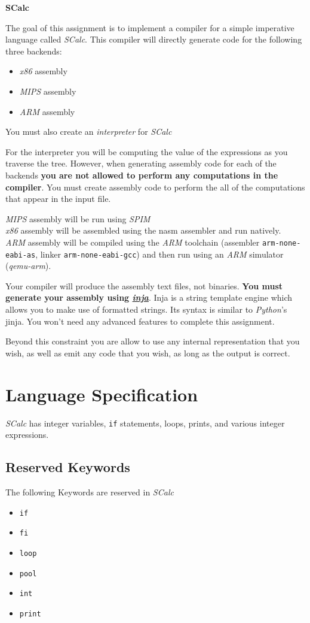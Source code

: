 \documentclass{article}
\newcommand{\code}[1]{\texttt{\textmd{#1}}}
\begin{document}
\ifpdf
  \LARGE
  \textbf{SCalc}
  \normalsize
\fi

The goal of this assignment is to implement a compiler for a simple imperative language called
\textit{SCalc}. This compiler will directly generate code for the following three backends:
\begin {itemize}
  \item \textit{x86} assembly
  \item \textit{MIPS} assembly
  \item \textit{ARM} assembly
\end {itemize}
You must also create an \textit{interpreter} for \textit{SCalc}

For the interpreter you will be computing the value of the expressions as you traverse the tree.
However, when generating assembly code for each of the backends \textbf{you are not allowed to
perform any computations in the compiler}. You must create assembly code to perform the all of the
computations that appear in the input file.

\textit{MIPS} assembly will be run using \textit{SPIM}\\
\textit{x86} assembly will be assembled using the nasm assembler and run natively.\\
\textit{ARM} assembly will be compiled using the \textit{ARM} toolchain (assembler
\code{arm-none-eabi-as}, linker \code{arm-none-eabi-gcc}) and then run using an \textit{ARM}
simulator (\textit{qemu-arm}).

Your compiler will produce the assembly text files, not binaries. \textbf{You must generate your
assembly using \href{https://github.com/pantor/inja}{\textit{inja}}}. Inja is a string template
engine which allows you to make use of formatted strings. Its syntax is similar to
\textit{Python}'s jinja. You won't need any advanced features to complete this assignment.

Beyond this constraint you are allow to use any internal representation that you wish, as well as
emit any code that you wish, as long as the output is correct.

\section{Language Specification}
\textit{SCalc} has integer variables, \code{if} statements, loops, prints, and various integer expressions.
\subsection{Reserved Keywords}
The following Keywords are reserved in \textit{SCalc}
\begin {itemize}
  \item{\code{if}}
  \item{\code{fi}}
  \item{\code{loop}}
  \item{\code{pool}}
  \item{\code{int}}
  \item{\code{print}}
\end {itemize}
\end{document}
